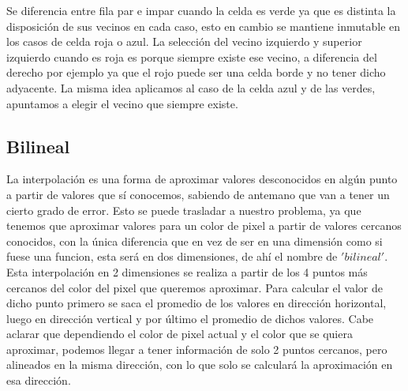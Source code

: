 
Se diferencia entre fila par e impar cuando la celda es verde ya que es distinta la disposición de sus vecinos en cada caso, esto en cambio se mantiene inmutable en los casos de celda roja o azul. La selección del
vecino izquierdo y superior izquierdo cuando es roja es porque siempre existe ese vecino, a diferencia del derecho por ejemplo ya que el rojo puede ser una celda borde y no tener dicho adyacente. La misma idea aplicamos 
al caso de la celda azul y de las verdes, apuntamos a elegir el vecino que siempre existe.

\subsection{Bilineal}

La interpolación es una forma de aproximar valores desconocidos en algún punto a partir de valores que sí conocemos, sabiendo de antemano que van a tener un cierto grado de error. Esto se puede trasladar a nuestro problema, ya que tenemos que aproximar valores para un color de pixel a partir de valores cercanos conocidos, con la única diferencia que en vez de ser en una dimensión como si fuese una funcion, esta será en dos dimensiones, de ahí el nombre de $'bilineal'$. Esta interpolación en 2 dimensiones se realiza a partir de los 4 puntos más cercanos del color del pixel que queremos aproximar. Para calcular el valor de dicho punto primero se saca el promedio de los valores en dirección horizontal, luego en dirección vertical y por último el promedio de dichos valores. Cabe aclarar que dependiendo el color de pixel actual y el color que se quiera aproximar, podemos llegar a tener información de solo 2 puntos cercanos, pero alineados en la misma dirección, con lo que solo se calculará la aproximación en esa dirección.


